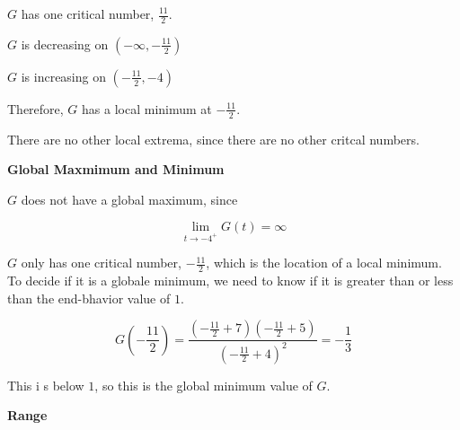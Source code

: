 \documentclass{ximera}
\begin{document}
\begin{explanation}


$G$ has one critical number, $\frac{11}{2}$.


$G$ is decreasing on $\left( -\infty, -\frac{11}{2} \right)$

$G$ is increasing on $\left( -\frac{11}{2}, -4 \right)$

Therefore, $G$ has a local minimum at $-\frac{11}{2}$.


There are no other local extrema, since there are no other critcal numbers.


\end{explanation}












\textbf{\textcolor{purple!85!blue}{Global Maxmimum and Minimum}} \\

\begin{explanation}


$G$ does not have a global maximum, since 


\[
\lim\limits_{t \to -4^+} G(t) = \infty
\]


$G$ only has one critical number, $-\frac{11}{2}$, which is the location of a local minimum.  To decide if it is a globale minimum, we need to know if it is greater than or less than the end-bhavior value of $1$.




\[
G\left( -\frac{11}{2} \right) = \frac{\left( -\frac{11}{2}+7 \right) \left( -\frac{11}{2}+5 \right)}{\left( -\frac{11}{2}+4 \right)^2} = -\frac{1}{3} 
\]


This i s below $1$, so this is the global minimum value of $G$. \\



\end{explanation}














\textbf{\textcolor{purple!85!blue}{Range}} \\
\end{document}

